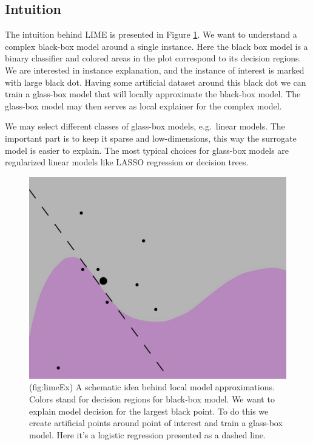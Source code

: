 \documentclass[12pt,]{krantz}
\theoremstyle{definition}
\theoremstyle{definition}
\theoremstyle{definition}
\theoremstyle{remark}
\begin{document}
\hypertarget{intuition-3}{%
\subsection{Intuition}\label{intuition-3}}

The intuition behind LIME is presented in Figure \ref{fig:limeEx}. We
want to understand a complex black-box model around a single instance.
Here the black box model is a binary classifier and colored areas in the
plot correspond to its decision regions. We are interested in instance
explanation, and the instance of interest is marked with large black
dot. Having some artificial dataset around this black dot we can train a
glass-box model that will locally approximate the black-box model. The
glass-box model may then serves as local explainer for the complex
model.

We may select different classes of glass-box models, e.g.~linear models.
The important part is to keep it sparse and low-dimensions, this way the
surrogate model is easier to explain. The most typical choices for
glass-box models are regularized linear models like LASSO regression or
decision trees.

\begin{figure}

{\centering \includegraphics[width=0.7\linewidth]{figure/limeEx} 

}

\caption{(fig:limeEx) A schematic idea behind local model approximations. Colors stand for decision regions for black-box model. We want to explain model decision for the largest black point. To do this we create artificial points around point of interest and train a glass-box model. Here it's a logistic regression presented as a dashed line.}\label{fig:limeEx}
\end{figure}
\end{document}
